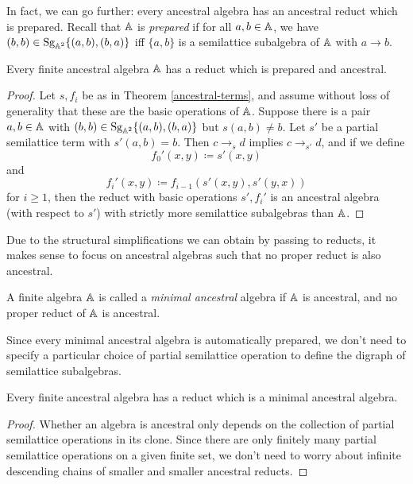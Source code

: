 \documentclass[letterpaper,11pt]{article}
\DeclareMathOperator{\Sg}{Sg}
\begin{document}
In fact, we can go further: every ancestral algebra has an ancestral reduct which is prepared. Recall that $\mathbb{A}$ is \emph{prepared} if for all $a,b \in \mathbb{A}$, we have $(b,b) \in \Sg_{\bA^2}\{(a,b),(b,a)\}$ iff $\{a,b\}$ is a semilattice subalgebra of $\mathbb{A}$ with $a \rightarrow b$.%

\begin{thm} Every finite ancestral algebra $\mathbb{A}$ has a reduct which is prepared and ancestral.
\end{thm}
\begin{proof} Let $s, f_i$ be as in Theorem \ref{ancestral-terms}, and assume without loss of generality that these are the basic operations of $\mathbb{A}$. Suppose there is a pair $a,b \in \mathbb{A}$ with $(b,b) \in \Sg_{\bA^2}\{(a,b),(b,a)\}$ but $s(a,b) \ne b$. Let $s'$ be a partial semilattice term with $s'(a,b) = b$. Then $c \rightarrow_{s} d$ implies $c \rightarrow_{s'} d$, and if we define
\[
f_0'(x,y) \coloneqq s'(x,y)
\]
and
\[
f_i'(x,y) \coloneqq f_{i-1}(s'(x,y),s'(y,x))
\]
for $i \ge 1$, then the reduct with basic operations $s', f_i'$ is an ancestral algebra (with respect to $s'$) with strictly more semilattice subalgebras than $\mathbb{A}$.
\end{proof}

Due to the structural simplifications we can obtain by passing to reducts, it makes sense to focus on ancestral algebras such that no proper reduct is also ancestral.

\begin{defn} A finite algebra $\mathbb{A}$ is called a \emph{minimal ancestral} algebra if $\mathbb{A}$ is ancestral, and no proper reduct of $\mathbb{A}$ is ancestral.
\end{defn}

Since every minimal ancestral algebra is automatically prepared, we don't need to specify a particular choice of partial semilattice operation to define the digraph of semilattice subalgebras.

\begin{prop} Every finite ancestral algebra has a reduct which is a minimal ancestral algebra.
\end{prop}
\begin{proof} Whether an algebra is ancestral only depends on the collection of partial semilattice operations in its clone. Since there are only finitely many partial semilattice operations on a given finite set, we don't need to worry about infinite descending chains of smaller and smaller ancestral reducts.
\end{proof}
\end{document}
